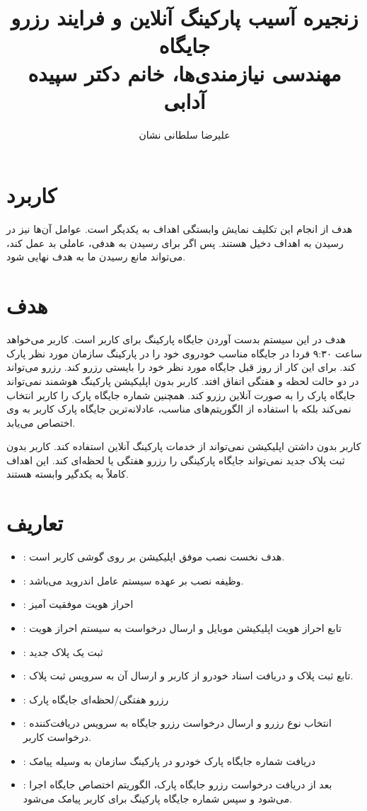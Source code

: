 \documentclass[a4paper]{report}
\title{زنجیره آسیب پارکینگ آنلاین و فرایند رزرو جایگاه \\ مهندسی نیازمندی‌ها،
خانم دکتر سپیده آدابی}
\author{علیرضا سلطانی نشان}
\begin{document}
\maketitle

\section{کاربرد}

هدف از انجام این تکلیف نمایش وابستگی اهداف به یکدیگر است. عوامل آن‌ها نیز در
رسیدن به اهداف دخیل هستند. پس اگر برای رسیدن به هدفی، عاملی بد عمل کند، می‌تواند
مانع رسیدن ما به هدف نهایی شود.

\section{هدف}

هدف در این سیستم بدست آوردن جایگاه پارکینگ برای کاربر است. کاربر می‌خواهد ساعت
۹:۳۰ فردا در جایگاه مناسب خودروی خود را در پارکینگ سازمان مورد نظر پارک کند.
برای این کار از روز قبل جایگاه مورد نظر خود را بایستی رزرو کند. رزرو می‌تواند در
دو حالت لحظه و هفتگی اتفاق افتد. کاربر بدون اپلیکیشن پارکینگ هوشمند نمی‌تواند
جایگاه پارک را به صورت آنلاین رزرو کند. همچنین شماره جایگاه پارک را کاربر انتخاب
نمی‌کند بلکه با استفاده از الگوریتم‌های مناسب، عادلانه‌ترین جایگاه پارک کاربر به
وی اختصاص می‌یابد.

کاربر بدون داشتن اپلیکیشن نمی‌تواند از خدمات پارکینگ آنلاین استفاده کند. کاربر
بدون ثبت پلاک جدید نمی‌تواند جایگاه پارکینگی را رزرو هفتگی یا لحظه‌ای کند. این
اهداف کاملاً به یکدگیر وابسته هستند.

\section{تعاریف}

\begin{itemize}
    \item {}: هدف نخست نصب موفق اپلیکیشن بر روی گوشی کاربر است.
    \item {}: وظیفه نصب بر عهده سیستم عامل اندروید می‌باشد.
    \item {}: احراز هویت موفقیت آمیز
    \item {}: تابع احراز هویت اپلیکیشن موبایل و ارسال درخواست به سیستم
    احراز هویت
    \item {}: ثبت یک پلاک جدید
    \item {}: تابع ثبت پلاک و دریافت اسناد خودرو از کاربر و ارسال آن
    به سرویس ثبت پلاک.
    \item {}: رزرو هفتگی/لحظه‌ای جایگاه پارک
    \item {}: انتخاب نوع رزرو و ارسال درخواست رزرو جایگاه به سرویس
    دریافت‌کننده درخواست کاربر.
    \item {}: دریافت شماره جایگاه پارک خودرو در پارکینگ سازمان به وسیله
    پیامک
    \item {}: بعد از دریافت درخواست رزرو جایگاه پارک، الگوریتم اختصاص
    جایگاه اجرا می‌شود و سپس شماره جایگاه پارکینگ برای کاربر پیامک می‌شود.
\end{itemize}
\end{document}
